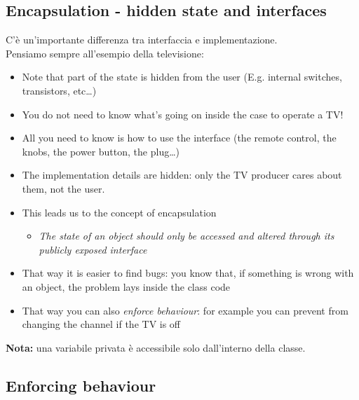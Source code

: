 \subsection{Encapsulation - hidden state and interfaces}

C'è un'importante differenza tra interfaccia e implementazione.\\
Pensiamo sempre all'esempio della televisione:




\begin{itemize}
  \item Note that part of the state is hidden from the user (E.g. internal switches, transistors, etc\dots)

  \smallskip
  \item You do not need to know what's going on inside the case to operate a TV!
  \smallskip
  \item All you need to know is how to use the \alert{interface} (the remote
        control, the knobs, the power button, the plug\dots)
  \smallskip
  \item The \alert{implementation} details are hidden: only the TV producer cares about
        them, not the user. 
  \end{itemize}

\begin{itemize}
    \item This leads us to the concept of \alert{encapsulation} 
    \begin{itemize}
      \item \emph{The state of an object should only be accessed and altered
                  through its publicly exposed interface}
    \end{itemize}
    \item That way it is easier to find bugs: you know that, if something is wrong
          with an object, the problem lays inside the class code
    \item That way you can also \emph{enforce behaviour}: for example you can
          prevent from changing the channel if the TV is off
    
\end{itemize}

\textbf{Nota:} una variabile privata è accessibile solo dall'interno della classe.\\

\subsection{Enforcing behaviour}

